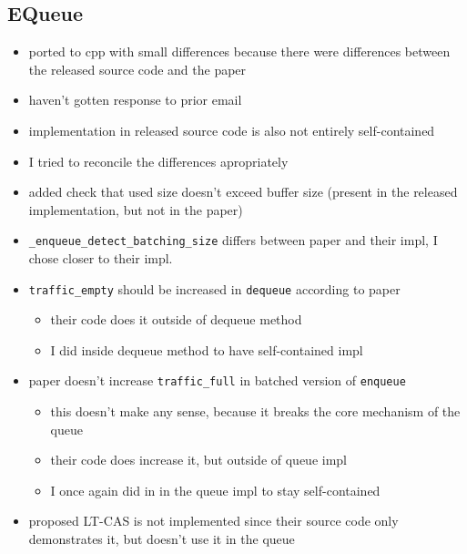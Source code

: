 \subsection{EQueue}
\begin{itemize}
    \item ported to cpp with small differences because there were differences between the released source code and the paper
    \item haven't gotten response to prior email
    \item implementation in released source code is also not entirely self-contained
    \item I tried to reconcile the differences apropriately
    \item added check that used size doesn't exceed buffer size (present in the released implementation, but not in the paper)
    \item \texttt{\_enqueue\_detect\_batching\_size} differs between paper and their impl, I chose closer to their impl.
    \item \texttt{traffic\_empty} should be increased in \texttt{dequeue} according to paper
        \begin{itemize}
            \item their code does it outside of dequeue method
            \item I did inside dequeue method to have self-contained impl
        \end{itemize}
    \item paper doesn't increase \texttt{traffic\_full} in batched version of \texttt{enqueue}
          \begin{itemize}
              \item this doesn't make any sense, because it breaks the core mechanism of the queue
              \item their code does increase it, but outside of queue impl
              \item I once again did in in the queue impl to stay self-contained
          \end{itemize}
    \item proposed LT-CAS is not implemented since their source code only demonstrates it, but doesn't use it in the queue
\end{itemize}

